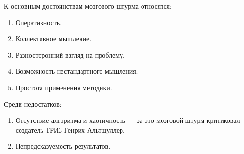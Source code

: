 К основным достоинствам мозгового штурма относятся:

\begin{enumerate}
\item Оперативность.

\item Коллективное мышление.

\item Разносторонний взгляд на проблему.

\item Возможность нестандартного мышления.

\item Простота применения методики.
\end{enumerate}

Среди недостатков: 
\begin{enumerate}
\item Отсутствие алгоритма и хаотичность — за это мозговой штурм критиковал создатель ТРИЗ Генрих Альтшуллер.

\item Непредсказуемость результатов.
\end{enumerate}
